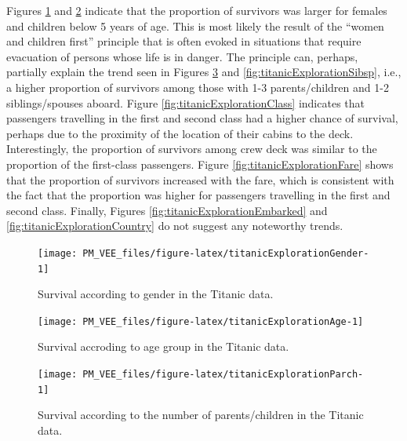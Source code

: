 \documentclass[12pt,]{krantz}
\theoremstyle{definition}
\theoremstyle{definition}
\theoremstyle{definition}
\theoremstyle{remark}
\begin{document}
Figures \ref{fig:titanicExplorationGender} and
\ref{fig:titanicExplorationAge} indicate that the proportion of
survivors was larger for females and children below 5 years of age. This
is most likely the result of the ``women and children first'' principle
that is often evoked in situations that require evacuation of persons
whose life is in danger. The principle can, perhaps, partially explain
the trend seen in Figures \ref{fig:titanicExplorationParch} and
\ref{fig:titanicExplorationSibsp}, i.e., a higher proportion of
survivors among those with 1-3 parents/children and 1-2 siblings/spouses
aboard. Figure \ref{fig:titanicExplorationClass} indicates that
passengers travelling in the first and second class had a higher chance
of survival, perhaps due to the proximity of the location of their
cabins to the deck. Interestingly, the proportion of survivors among
crew deck was similar to the proportion of the first-class passengers.
Figure \ref{fig:titanicExplorationFare} shows that the proportion of
survivors increased with the fare, which is consistent with the fact
that the proportion was higher for passengers travelling in the first
and second class. Finally, Figures \ref{fig:titanicExplorationEmbarked}
and \ref{fig:titanicExplorationCountry} do not suggest any noteworthy
trends.

\begin{figure}

{\centering \texttt{[image: PM\_VEE\_files/figure-latex/titanicExplorationGender-1]} 

}

\caption{Survival according to gender in the Titanic data.}\label{fig:titanicExplorationGender}
\end{figure}

\begin{figure}

{\centering \texttt{[image: PM\_VEE\_files/figure-latex/titanicExplorationAge-1]} 

}

\caption{Survival accroding to age group in the Titanic data.}\label{fig:titanicExplorationAge}
\end{figure}

\begin{figure}

{\centering \texttt{[image: PM\_VEE\_files/figure-latex/titanicExplorationParch-1]} 

}

\caption{Survival according to the number of parents/children in the Titanic data.}\label{fig:titanicExplorationParch}
\end{figure}
\end{document}
